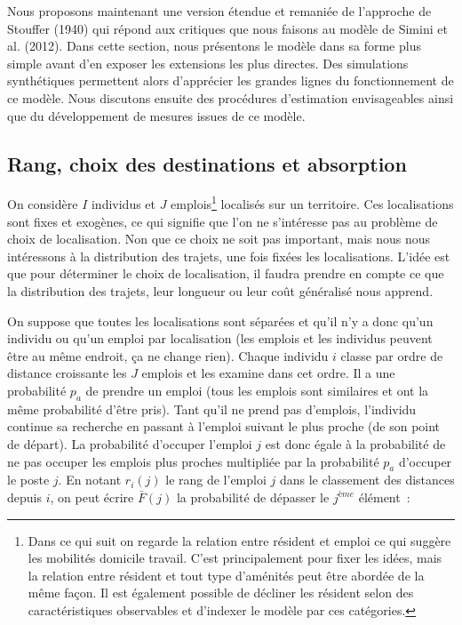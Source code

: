 \documentclass[
  10pt,
  a4paper,
  numbers=noendperiod,
  DIV=9]{scrartcl}
\begin{document}
Nous proposons maintenant une version étendue et remaniée de l'approche
de Stouffer (1940) qui répond aux critiques que nous faisons au modèle
de Simini et al. (2012). Dans cette section, nous présentons le modèle
dans sa forme plus simple avant d'en exposer les extensions les plus
directes. Des simulations synthétiques permettent alors d'apprécier les
grandes lignes du fonctionnement de ce modèle. Nous discutons ensuite
des procédures d'estimation envisageables ainsi que du développement de
mesures issues de ce modèle.

\hypertarget{rang-choix-des-destinations-et-absorption}{%
\subsection{Rang, choix des destinations et
absorption}\label{rang-choix-des-destinations-et-absorption}}

On considère \(I\) individus et \(J\) emplois\footnote{Dans ce qui suit
  on regarde la relation entre résident et emploi ce qui suggère les
  mobilités domicile travail. C'est principalement pour fixer les idées,
  mais la relation entre résident et tout type d'aménités peut être
  abordée de la même façon. Il est également possible de décliner les
  résident selon des caractéristiques observables et d'indexer le modèle
  par ces catégories.} localisés sur un territoire. Ces localisations
sont fixes et exogènes, ce qui signifie que l'on ne s'intéresse pas au
problème de choix de localisation. Non que ce choix ne soit pas
important, mais nous nous intéressons à la distribution des trajets, une
fois fixées les localisations. L'idée est que pour déterminer le choix
de localisation, il faudra prendre en compte ce que la distribution des
trajets, leur longueur ou leur coût généralisé nous apprend.

On suppose que toutes les localisations sont séparées et qu'il n'y a
donc qu'un individu ou qu'un emploi par localisation (les emplois et les
individus peuvent être au même endroit, ça ne change rien). Chaque
individu \(i\) classe par ordre de distance croissante les \(J\) emplois
et les examine dans cet ordre. Il a une probabilité \(p_a\) de prendre
un emploi (tous les emplois sont similaires et ont la même probabilité
d'être pris). Tant qu'il ne prend pas d'emplois, l'individu continue sa
recherche en passant à l'emploi suivant le plus proche (de son point de
départ). La probabilité d'occuper l'emploi \(j\) est donc égale à la
probabilité de ne pas occuper les emplois plus proches multipliée par la
probabilité \(p_a\) d'occuper le poste \(j\). En notant \(r_{i}(j)\) le
rang de l'emploi \(j\) dans le classement des distances depuis \(i\), on
peut écrire \(\bar F(j)\) la probabilité de dépasser le \(j^{ème}\)
élément~:
\end{document}
